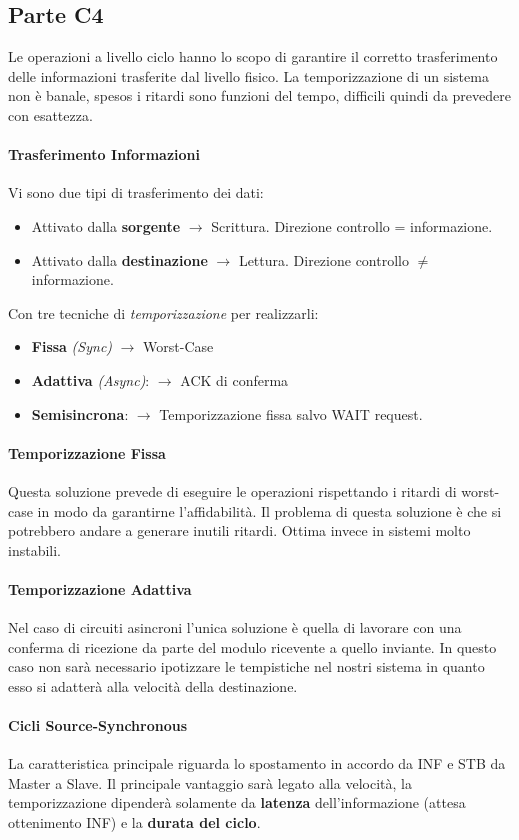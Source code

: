 \documentclass[12pt]{article}
\begin{document}
\subsection{Parte C4}\label{c4}
Le operazioni a livello ciclo hanno lo scopo di garantire il corretto trasferimento delle informazioni trasferite dal livello fisico. La temporizzazione di un sistema non è banale, spesos i ritardi sono funzioni del tempo, difficili quindi da prevedere con esattezza.
\paragraph{Trasferimento Informazioni}
Vi sono due tipi di trasferimento dei dati:
\begin{itemize}
  \item Attivato dalla \textbf{sorgente} $\rightarrow$ Scrittura. Direzione controllo = informazione.
  \item Attivato dalla \textbf{destinazione} $\rightarrow$ Lettura. Direzione controllo  $\neq$ informazione.
\end{itemize}
Con tre tecniche di \textit{temporizzazione} per realizzarli:
\begin{itemize}
  \item \textbf{Fissa} \textit{(Sync)} $\rightarrow$ Worst-Case
  \item \textbf{Adattiva} \textit{(Async)}: $\rightarrow$ ACK di conferma
  \item \textbf{Semisincrona}: $\rightarrow$ Temporizzazione fissa salvo WAIT request.
\end{itemize}
\paragraph{Temporizzazione Fissa} Questa soluzione prevede di eseguire le operazioni rispettando i ritardi di worst-case in modo da garantirne l'affidabilità. Il problema di questa soluzione è che si potrebbero andare a generare inutili ritardi. Ottima invece in sistemi molto instabili.
\paragraph{Temporizzazione Adattiva}
Nel caso di circuiti asincroni l'unica soluzione è quella di lavorare con una conferma di ricezione da parte del modulo ricevente a quello inviante. In questo caso non sarà necessario ipotizzare le tempistiche nel nostri sistema in quanto esso si adatterà alla velocità della destinazione.
\paragraph{Cicli Source-Synchronous}
La caratteristica principale riguarda lo spostamento in accordo da INF e STB da Master a Slave. Il principale vantaggio sarà legato alla velocità, la temporizzazione dipenderà solamente da \textbf{latenza} dell'informazione (attesa ottenimento INF) e la \textbf{durata del ciclo}.
\end{document}

